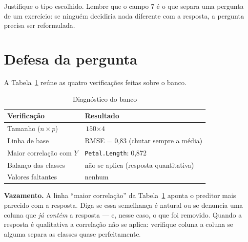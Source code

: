 \documentclass[
  article,
  12pt,
  oneside,
  a4paper,
  english,
  brazil
]{abntex2}\usepackage[]{graphicx}\usepackage[]{xcolor}
\begin{document}
Justifique o tipo escolhido. Lembre que o campo 7 é o que separa uma pergunta de
um exercício: se ninguém decidiria nada diferente com a resposta, a pergunta
precisa ser reformulada.

\section{Defesa da pergunta}

A Tabela~\ref{tab:diag} reúne as quatro verificações feitas sobre o banco.

\begin{table}[htb]
  \centering
  \caption{Diagnóstico do banco}
  \label{tab:diag}
  \small
  \begin{tabular}{@{}p{}p{}@{}}
    \toprule
    \textbf{Verificação} & \textbf{Resultado} \\
    \midrule
    Tamanho ($n \times p$)   & $\text{150} \times \text{4}$ \\
    Linha de base            & RMSE = 0,83 \quad (chutar sempre a m\'edia) \\
    Maior correlação com $Y$ & \texttt{Petal.Length}: 0,872 \\
    Balanço das classes      & n\~ao se aplica (resposta quantitativa) \\
    Valores faltantes        & nenhum \\
    \bottomrule
  \end{tabular}
\end{table}

\textbf{Vazamento.} A linha ``maior correlação'' da Tabela~\ref{tab:diag}
aponta o preditor mais parecido com a resposta. Diga se essa semelhança é
natural ou se denuncia uma coluna que \emph{já contém} a resposta --- e, nesse
caso, o que foi removido. Quando a resposta é qualitativa a correlação não se
aplica: verifique coluna a coluna se alguma separa as classes quase
perfeitamente.
\end{document}
